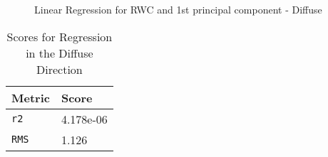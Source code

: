 \begin{figure}[!htb]
    \begin{center}
    \end{center}
    \caption{Linear Regression for RWC and 1st principal component - Diffuse}
    \label{fig:polarization}
\end{figure}
%
%
\begin{table}[htb]
  \centering
  \begin{tabular}{ll}
    \toprule
    \textbf{Metric} & \textbf{Score}\\
    \midrule
      \texttt{r2} & 4.178e-06 \\
      \texttt{RMS} & 1.126 \\
    \bottomrule
  \end{tabular}
  \caption{%
    Scores for Regression in the Diffuse Direction
  }
  \label{tab:Packages}
\end{table}
